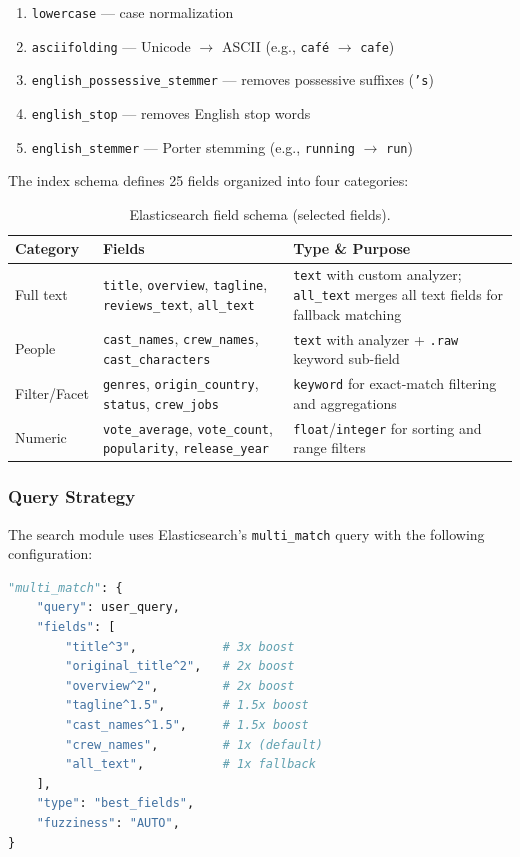\documentclass[11pt,a4paper]{article}
\begin{document}
\begin{enumerate}[nosep]
  \item \texttt{lowercase} --- case normalization
  \item \texttt{asciifolding} --- Unicode $\to$ ASCII (e.g., \texttt{caf\'e} $\to$ \texttt{cafe})
  \item \texttt{english\_possessive\_stemmer} --- removes possessive suffixes (\texttt{'s})
  \item \texttt{english\_stop} --- removes English stop words
  \item \texttt{english\_stemmer} --- Porter stemming (e.g., \texttt{running} $\to$ \texttt{run})
\end{enumerate}

\noindent The index schema defines 25 fields organized into four categories:

\begin{table}[H]
\centering
\small
\begin{tabular}{@{}llp{7.5cm}@{}}
\toprule
\textbf{Category} & \textbf{Fields} & \textbf{Type \& Purpose} \\
\midrule
Full text & \texttt{title}, \texttt{overview}, \texttt{tagline}, \texttt{reviews\_text}, \texttt{all\_text} & \texttt{text} with custom analyzer; \texttt{all\_text} merges all text fields for fallback matching \\
People & \texttt{cast\_names}, \texttt{crew\_names}, \texttt{cast\_characters} & \texttt{text} with analyzer + \texttt{.raw} keyword sub-field \\
Filter/Facet & \texttt{genres}, \texttt{origin\_country}, \texttt{status}, \texttt{crew\_jobs} & \texttt{keyword} for exact-match filtering and aggregations \\
Numeric & \texttt{vote\_average}, \texttt{vote\_count}, \texttt{popularity}, \texttt{release\_year} & \texttt{float}/\texttt{integer} for sorting and range filters \\
\bottomrule
\end{tabular}
\caption{Elasticsearch field schema (selected fields).}
\end{table}

\subsubsection{Query Strategy}

The search module uses Elasticsearch's \texttt{multi\_match} query with the following configuration:

\begin{lstlisting}[language=Python]
"multi_match": {
    "query": user_query,
    "fields": [
        "title^3",            # 3x boost
        "original_title^2",   # 2x boost
        "overview^2",         # 2x boost
        "tagline^1.5",        # 1.5x boost
        "cast_names^1.5",     # 1.5x boost
        "crew_names",         # 1x (default)
        "all_text",           # 1x fallback
    ],
    "type": "best_fields",
    "fuzziness": "AUTO",
}
\end{lstlisting}
\end{document}
